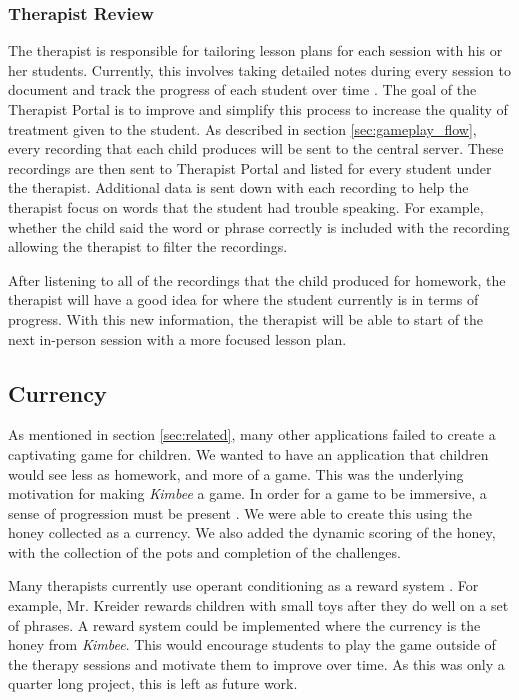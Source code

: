 \documentclass{sig-alternate-2013}
\begin{document}
\subsubsection{Therapist Review}

The therapist is responsible for tailoring lesson plans for each session with his or her students. Currently, this involves taking detailed notes during every session to document and track the progress of each student over time \cite{Kreider:Intro}. The goal of the Therapist Portal is to improve and simplify this process to increase the quality of treatment given to the student. As described in section \ref{sec:gameplay_flow}, every recording that each child produces will be sent to the central server. These recordings are then sent to Therapist Portal and listed for every student under the therapist. Additional data is sent down with each recording to help the therapist focus on words that the student had trouble speaking. For example, whether the child said the word or phrase correctly is included with the recording allowing the therapist to filter the recordings.

After listening to all of the recordings that the child produced for homework, the therapist will have a good idea for where the student currently is in terms of progress. With this new information, the therapist will be able to start of the next in-person session with a more focused lesson plan.

\subsection{Currency}

As mentioned in section \ref{sec:related}, many other applications failed to create a captivating game for children. We wanted to have an application that children would see less as homework, and more of a game. This was the underlying motivation for making {\em Kimbee} a game. In order for a game to be immersive, a sense of progression must be present \cite{Ermi:Gameplay}. We were able to create this using the honey collected as a currency. We also added the dynamic scoring of the honey, with the collection of the pots and completion of the challenges.

Many therapists currently use operant conditioning as a reward system \cite{Kreider:Intro}. For example, Mr. Kreider rewards children with small toys after they do well on a set of phrases. A reward system could be implemented where the currency is the honey from {\em Kimbee}. This would encourage students to play the game outside of the therapy sessions and motivate them to improve over time. As this was only a quarter long project, this is left as future work.
\end{document}

